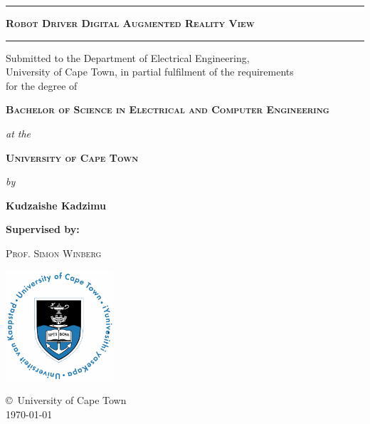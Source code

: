 \documentclass[a4paper, 12pt, onecolumn, twoside]{report}
\begin{document}
\begin{titlepage}
\begin{center}
\vspace*{-1cm} %

\hrule
\vspace*{0.3cm}

{\Large\bfseries\scshape Robot Driver Digital Augmented Reality View}

\vspace*{0.4cm}
\hrule
\vspace*{0.5cm}

{\small
\textsf{Submitted to the Department of Electrical Engineering,\\
University of Cape Town, in partial fulfilment of the requirements\\
for the degree of}
\vspace*{0.3cm}

{\scshape\bfseries Bachelor of Science in Electrical and Computer Engineering}
\vspace*{0.3cm}

\emph{at the}
\vspace*{0.3cm}

{\scshape\bfseries University of Cape Town}
\vspace*{0.3cm}

\emph{by}
\vspace*{0.3cm}

{\textsf{\bfseries Kudzaishe Kadzimu}}
}

\vspace*{0.3cm}
{\textsf{\bfseries Supervised by:}}
\vspace*{0.3cm}

{\scshape Prof. Simon Winberg}

\vfill
\includegraphics[width=4cm]{uctlogomain.png}
\vspace*{0.3cm}

\copyright\ University of Cape Town \\
{\textsf \today}
\end{center}
\end{titlepage}
\end{document}
